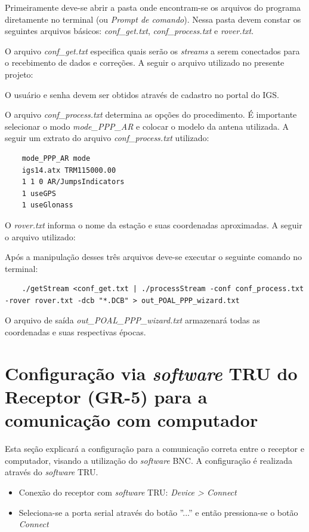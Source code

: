 Primeiramente deve-se abrir a pasta onde encontram-se os arquivos do programa diretamente no terminal (ou \textit{Prompt de comando}). Nessa pasta devem constar os seguintes arquivos básicos: \textit{conf\_get.txt}, \textit{conf\_process.txt} e \textit{rover.txt}.

O arquivo \textit{conf\_get.txt} especifica quais serão os \textit{streams} a serem conectados para o recebimento de dados e correções. A seguir o arquivo utilizado no presente projeto:



O usuário e senha devem ser obtidos através de cadastro no portal do IGS.

O arquivo \textit{conf\_process.txt} determina as opções do procedimento. É importante selecionar o modo \textit{mode\_PPP\_AR} e colocar o modelo da antena utilizada. A seguir um extrato do arquivo \textit{conf\_process.txt} utilizado:

\begin{lstlisting}
    mode_PPP_AR mode
    igs14.atx TRM115000.00
    1 1 0 AR/JumpsIndicators
    1 useGPS
    1 useGlonass
\end{lstlisting}

O \textit{rover.txt} informa o nome da estação e suas coordenadas aproximadas. A seguir o arquivo utilizado:


Após a manipulação desses três arquivos deve-se executar o seguinte comando no terminal:

\begin{lstlisting}
    ./getStream <conf_get.txt | ./processStream -conf conf_process.txt -rover rover.txt -dcb "*.DCB" > out_POAL_PPP_wizard.txt
\end{lstlisting}

O arquivo de saída \textit{out\_POAL\_PPP\_wizard.txt} armazenará todas as coordenadas e suas respectivas épocas.

\section{Configuração via \textit{software} TRU do Receptor (GR-5) para a comunicação com computador}

Esta seção explicará a configuração para a comunicação correta entre o receptor e computador, visando a utilização do \textit{software} BNC. A configuração é realizada através do \textit{software} TRU.

\begin{itemize}
    \item Conexão do receptor com \textit{software} TRU: \textit{Device > Connect}
    \item Seleciona-se a porta serial através do botão ''...'' e então pressiona-se o botão \textit{Connect}
\end{itemize}

